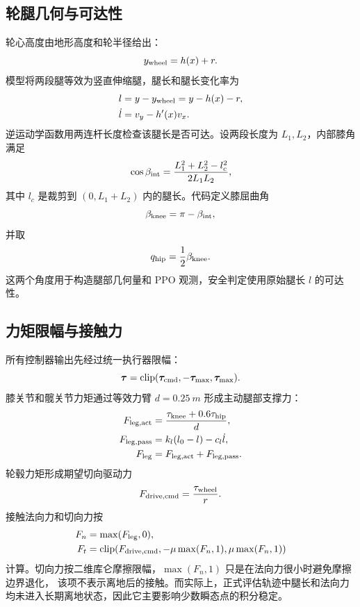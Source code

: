 \documentclass[UTF8,12pt,a4paper,fontset=none]{ctexart}
\begin{document}
\subsection{轮腿几何与可达性}
轮心高度由地形高度和轮半径给出：
\begin{equation}
y_{\rm wheel}=h(x)+r.
\end{equation}
模型将两段腿等效为竖直伸缩腿，腿长和腿长变化率为
\begin{align}
l&=y-y_{\rm wheel}=y-h(x)-r,\\
\dot l&=v_y-h'(x)v_x .
\end{align}
逆运动学函数用两连杆长度检查该腿长是否可达。设两段长度为 $L_1,L_2$，内部膝角满足
\begin{equation}
\cos\beta_{\rm int}=\frac{L_1^2+L_2^2-l_c^2}{2L_1L_2},
\end{equation}
其中 $l_c$ 是裁剪到 $(0,L_1+L_2)$ 内的腿长。代码定义膝屈曲角
\begin{equation}
\beta_{\rm knee}=\pi-\beta_{\rm int},
\end{equation}
并取
\begin{equation}
q_{\rm hip}=\frac12\beta_{\rm knee}.
\end{equation}
这两个角度用于构造腿部几何量和 PPO 观测，安全判定使用原始腿长 $l$ 的可达性。

\subsection{力矩限幅与接触力}
所有控制器输出先经过统一执行器限幅：
\begin{equation}
\bm\tau=\operatorname{clip}(\bm\tau_{\rm cmd},-\bm\tau_{\max},\bm\tau_{\max}).
\end{equation}
膝关节和髋关节力矩通过等效力臂 $d=\SI{0.25}{m}$ 形成主动腿部支撑力：
\begin{align}
F_{\rm leg,act}&=\frac{\tau_{\rm knee}+0.6\tau_{\rm hip}}{d},\\
F_{\rm leg,pass}&=k_l(l_0-l)-c_l\dot l,\\
F_{\rm leg}&=F_{\rm leg,act}+F_{\rm leg,pass}.
\end{align}
轮毂力矩形成期望切向驱动力
\begin{equation}
F_{\rm drive,cmd}=\frac{\tau_{\rm wheel}}{r}.
\end{equation}
接触法向力和切向力按
\begin{align}
F_n&=\max(F_{\rm leg},0),\\
F_t&=\operatorname{clip}\!\left(F_{\rm drive,cmd},-\mu\max(F_n,1),\mu\max(F_n,1)\right)
\end{align}
计算。切向力按二维库仑摩擦限幅，$\max(F_n,1)$ 只是在法向力很小时避免摩擦边界退化，
该项不表示离地后的接触。而实际上，正式评估轨迹中腿长和法向力均未进入长期离地状态，因此它主要影响少数瞬态点的积分稳定。
\end{document}
